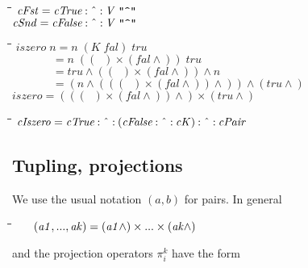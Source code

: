 \documentclass{article}
\newlength{\lwidth}\setlength{\lwidth}{4.5cm}
\newlength{\cwidth}\setlength{\cwidth}{8mm} %
\newcommand{\Conid}[1]{\mathit{#1}}
\newcommand{\Varid}[1]{\mathit{#1}}
\begin{document}
\begin{tabbing}
\qquad\=\hspace{\lwidth}\=\hspace{\cwidth}\=\+\kill
${\Varid{cFst}\mathrel{=}\Varid{cTrue}\mathbin{:\char94 :}\Conid{V}\;\text{\ttfamily \char34 \char94 \char34}}$\\
${\Varid{cSnd}\mathrel{=}\Varid{cFalse}\mathbin{:\char94 :}\Conid{V}\;\text{\ttfamily \char34 \char94 \char34}}$
\end{tabbing}

\begin{tabbing}
\qquad\=\hspace{\lwidth}\=\hspace{\cwidth}\=\+\kill
${\Varid{iszero}\;\Varid{n}\mathrel{=}\Varid{n}\;(\Conid{K}\;\Varid{fal})\;\Varid{tru}}$\\
${\phantom{\Varid{iszero}\;\Varid{n}\mbox{}}\mathrel{=}\Varid{n}\;((\!\mathop{{}^{{}^{\cdot}}}\!)\times(\Varid{fal}\wedge))\;\Varid{tru}}$\\
${\phantom{\Varid{iszero}\;\Varid{n}\mbox{}}\mathrel{=}\Varid{tru}\wedge((\!\mathop{{}^{{}^{\cdot}}}\!)\times(\Varid{fal}\wedge))\wedge\Varid{n}}$\\
${\phantom{\Varid{iszero}\;\Varid{n}\mbox{}}\mathrel{=}(\Varid{n}\wedge(((\!\mathop{{}^{{}^{\cdot}}}\!)\times(\Varid{fal}\wedge))\wedge))\wedge(\Varid{tru}\wedge)}$\\
${\Varid{iszero}\mathrel{=}(((\!\mathop{{}^{{}^{\cdot}}}\!)\times(\Varid{fal}\wedge))\wedge)\times(\Varid{tru}\wedge)}$
\end{tabbing}\begin{tabbing}
\qquad\=\hspace{\lwidth}\=\hspace{\cwidth}\=\+\kill
${\Varid{cIszero}\mathrel{=}\Varid{cTrue}\mathbin{:\char94 :}(\Varid{cFalse}\mathbin{:\char94 :}\Varid{cK})\mathbin{:\char94 :}\Varid{cPair}}$
\end{tabbing}


\subsection{Tupling, projections}

We use the usual notation $(a,b)$ for pairs.
In general

\begin{tabbing}
\qquad\=\hspace{\lwidth}\=\hspace{\cwidth}\=\+\kill
${\hskip1.50em\relax(\Varid{a1},\mathbin{...},\Varid{ak})\mathrel{=}(\Varid{a1}\wedge)\times\mathbin{...}\times(\Varid{ak}\wedge)}$
\end{tabbing}
and the projection operators $\pi^k_i$ have the form 
\end{document}
